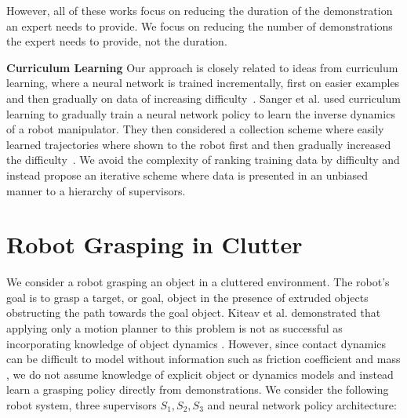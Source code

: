 \documentclass[10pt, conference]{ieeeconf}      %
\begin{document}
However, all of these works focus on reducing the duration of the demonstration an expert needs to provide. We focus on reducing the number of demonstrations the expert needs to provide, not the duration. 

\noindent\textbf{Curriculum Learning}
Our approach is closely related to ideas from curriculum learning, where a neural network is trained  
incrementally, first on easier examples and then gradually on data of increasing difficulty~\cite{bengio2009curriculum}.
Sanger et al. used curriculum learning to gradually train a neural network policy to learn the inverse
dynamics of a robot manipulator. They then considered a collection scheme where easily learned trajectories where shown
to the robot first and then gradually increased the difficulty~\cite{sanger1994neural}.
We avoid the complexity of ranking training data by difficulty and instead propose an iterative scheme where
data is presented in an unbiased manner to a hierarchy of supervisors.


\section{Robot Grasping in Clutter}\label{sec:sys}
 We consider a robot grasping an
object in a cluttered environment. The robot's goal is to grasp a  target, or goal, object in the presence of extruded
 objects obstructing the path towards the goal object. Kiteav et al. demonstrated that applying only a motion planner to this problem is not as successful as incorporating knowledge of object dynamics \cite{kitaevphysics}. However, since contact dynamics can be difficult to model without  information such as friction coefficient and mass \cite{kitaevphysics,kingnonprehensile}, we do not assume knowledge of explicit object or dynamics models and instead learn a grasping policy directly from demonstrations. We consider the following robot system, three supervisors $S_1, S_2, S_3$ and neural network policy architecture:
\end{document}
